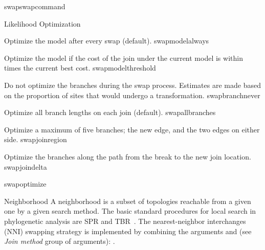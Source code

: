 \begin{command}{swap}{swapcommand}
\begin{arguments}
\begin{argumentgroup}{Likelihood Optimization}
{\begin{description}
                        {Optimize the model after every swap (default).}
                        {swapmodelalways}

                        {Optimize the model if the cost of the join under the
                        current model is within  times the
                        current best cost.}
                        {swapmodelthreshold}

                        {Do not optimize the branches during the swap process.
                        Estimates are made based on the proportion of sites that
                        would undergo a transformation.}
                        {swapbranchnever}

                        {Optimize all branch lengths on each join (default).}
                        {swapallbranches}

                        {Optimize a maximum of five branches; the new edge, and the two
                        edges on either side.}
                        {swapjoinregion}

                        {Optimize the branches along the path from the break to the
                        new join location.}
                        {swapjoindelta}

                \end{description} }
                {swapoptimize}

        \end{argumentgroup}

	    \begin{argumentgroup}{Neighborhood}
	        {A neighborhood is a subset of topologies reachable from a given one by a given search method. The basic standard procedures for local search in phylogenetic analysis are SPR and TBR~\cite{swofford1990}. The nearest-neighbor interchanges (NNI) swapping strategy is implemented by combining 
            the arguments  and  (see \emph{Join method} group of
            arguments): .
            }
            \label{swap_neigh}


\end{argumentgroup}
\end{arguments}
\end{command}
